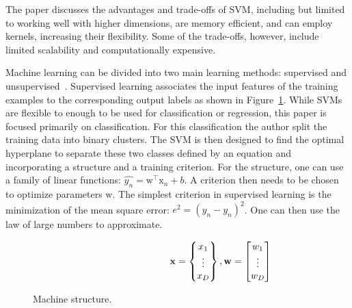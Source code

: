 \documentclass[journal]{IEEEtran}
\begin{document}
The paper discusses the advantages and trade-offs of SVM, including but limited to working well with higher dimensions, are memory efficient, and can employ kernels, increasing their flexibility. Some of the trade-offs, however, include limited scalability and computationally expensive.

Machine learning can be divided into two main learning methods: supervised and unsupervised~\cite{Stat}. Supervised learning associates the input features of the training examples to the corresponding output labels as shown in Figure~\ref{fig:Machine}. While SVMs are flexible to enough to be used for classification or regression, this paper is focused primarily on classification. For this classification the author split the training data into binary clusters. The SVM is then designed to find the optimal hyperplane to separate these two classes defined by an equation and incorporating a structure and a training criterion. For the structure, one can use a family of linear functions: \( \hat{y_n} = \bm{\mathrm{w}}^\top\bm{\mathrm{x}}_n + b\). A criterion then needs to be chosen to optimize parameters \( \bm{\mathrm {w}} \). The simplest criterion in supervised learning is the minimization of the mean square error: \( e^2 = \left(y_n - \hat{y_n} \right) ^2 \). One can then use the law of large numbers to approximate.

\begin{figure}[ht]
    \centering
    \vspace{-3em}
\begin{align*}
    \hspace{9em}
    \text{\textbf{x}} = \begin{Bmatrix}
    x_1\\
    \vdots\\
    x_D
    \end{Bmatrix},
    \text{\textbf{w}} = \begin{bmatrix}
    w_1\\
    \vdots\\
    w_D
    \end{bmatrix}
\end{align*}
\caption{Machine structure.}
\label{fig:Machine}
\end{figure}
\end{document}
